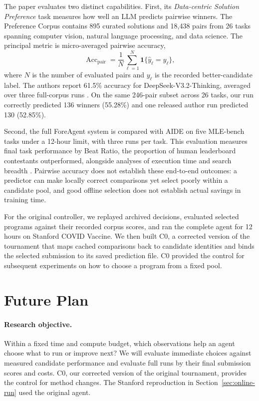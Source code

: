 \documentclass{article}
\begin{document}
The paper evaluates two distinct capabilities. First, its \emph{Data-centric Solution Preference} task measures how well an LLM predicts pairwise winners. The Preference Corpus contains 895 curated solutions and 18,438 pairs from 26 tasks spanning computer vision, natural language processing, and data science. The principal metric is micro-averaged pairwise accuracy,
\begin{equation}
  \operatorname{Acc}_{\mathrm{pair}}
  =\frac{1}{N}\sum_{\ell=1}^{N}
    \mathbf{1}\{\widehat{y}_{\ell}=y_{\ell}\},
  \label{eq:accuracy}
\end{equation}
where $N$ is the number of evaluated pairs and $y_\ell$ is the recorded better-candidate label. The authors report 61.5\% accuracy for DeepSeek-V3.2-Thinking, averaged over three full-corpus runs \citep[Table~2]{zheng2026predict}. On the same 246-pair subset across 26 tasks, our run correctly predicted 136 winners (55.28\%) and one released author run predicted 130 (52.85\%).

Second, the full ForeAgent system is compared with AIDE on five MLE-bench tasks under a 12-hour limit, with three runs per task. This evaluation measures final task performance by Beat Ratio, the proportion of human leaderboard contestants outperformed, alongside analyses of execution time and search breadth \citep[Sections~6.3--6.4]{zheng2026predict}. Pairwise accuracy does not establish these end-to-end outcomes: a predictor can make locally correct comparisons yet select poorly within a candidate pool, and good offline selection does not establish actual savings in training time.

For the original controller, we replayed archived decisions, evaluated selected programs against their recorded corpus scores, and ran the complete agent for 12 hours on Stanford COVID Vaccine. We then built C0, a corrected version of the tournament that maps cached comparisons back to candidate identities and binds the selected submission to its saved prediction file. C0 provided the control for subsequent experiments on how to choose a program from a fixed pool.


\clearpage

\section{Future Plan}
\label{sec:future-memory}

\paragraph{Research objective.}
Within a fixed time and compute budget, which observations help an agent choose what to run or improve next? We will evaluate immediate choices against measured candidate performance and evaluate full runs by their final submission scores and costs. C0, our corrected version of the original tournament, provides the control for method changes. The Stanford reproduction in Section~\ref{sec:online-run} used the original agent.
\end{document}

